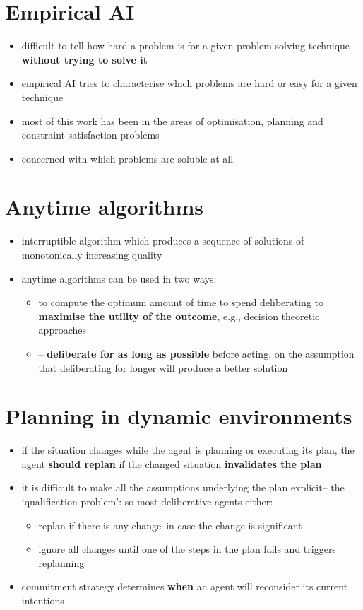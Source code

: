 \documentclass{article}
\begin{document}
\section{Empirical AI}
\begin{itemize}
  \item difficult to tell how hard a problem is for a given problem-solving technique \textbf{without trying to solve it} 
  \item empirical AI tries to characterise which problems are hard or easy for a given technique 
  \item most of this work has been in the areas of optimisation, planning and constraint satisfaction problems 
  \item concerned with which problems are soluble at all
\end{itemize}

\section{Anytime algorithms}
\begin{itemize}
  \item interruptible algorithm which produces a sequence of solutions of monotonically increasing quality 
  \item anytime algorithms can be used in two ways:
  \begin{itemize}
    \item to compute the optimum amount of time to spend deliberating to \textbf{maximise the utility of the outcome}, e.g., decision theoretic approaches
    \item – \textbf{deliberate for as long as possible} before acting, on the assumption that deliberating for longer will produce a better solution
  \end{itemize}
\end{itemize}

\section{Planning in dynamic environments}
\begin{itemize}
  \item if the situation changes while the agent is planning or executing its plan, the agent \textbf{should replan} if the changed situation \textbf{invalidates the plan}
  \item it is difficult to make all the assumptions underlying the plan explicit– the ‘qualification problem’: so most deliberative agents either:
  \begin{itemize}
    \item replan if there is any change–in case the change is significant
    \item ignore all changes until one of the steps in the plan fails and triggers replanning 
  \end{itemize}
  \item commitment strategy determines \textbf{when} an agent will reconsider its current intentions
\end{itemize}
\end{document}
